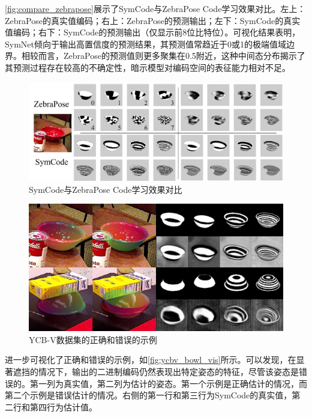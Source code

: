 \autoref{fig:compare_zebrapose}展示了SymCode与ZebraPose Code学习效果对比。左上：ZebraPose的真实值编码；右上：ZebraPose的预测输出；左下：SymCode的真实值编码；右下：SymCode的预测输出（仅显示前8位比特位）。可视化结果表明，SymNet倾向于输出高置信度的预测结果，其预测值常趋近于0或1的极端值域边界。相较而言，ZebraPose的预测值则更多聚集在0.5附近，这种中间态分布揭示了其预测过程存在较高的不确定性，暗示模型对编码空间的表征能力相对不足。

\begin{figure}[htbp]
        \centerline{\includegraphics[width=1.0\textwidth]{figure/symnet/compare_with_zebrapose.jpg}}
        \caption{SymCode与ZebraPose Code学习效果对比}
        \label{fig:compare_zebrapose}
\end{figure}

\begin{figure}[ht]
        \centerline{\includegraphics[width=1.0\textwidth]{figure/symnet/ycbv_bowl_vis.jpg}}
        \caption{YCB-V数据集的正确和错误的示例}
        \label{fig:ycbv_bowl_vis}
\end{figure}

进一步可视化了正确和错误的示例，如\autoref{fig:ycbv_bowl_vis}所示。可以发现，在显著遮挡的情况下，输出的二进制编码仍然表现出特定姿态的特征，尽管该姿态是错误的。第一列为真实值，第二列为估计的姿态。第一个示例是正确估计的情况，而第二个示例是错误估计的情况。右侧的第一行和第三行为SymCode的真实值，第二行和第四行为估计值。

